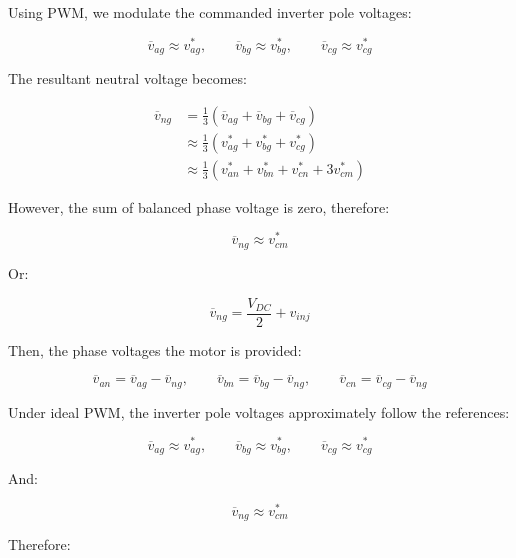 \documentclass{article}
\begin{document}
Using PWM, we modulate the commanded inverter pole voltages:

\begin{equation}
    \overline{v}_{ag} \approx v_{ag}^*, \qquad
    \overline{v}_{bg} \approx v_{bg}^*, \qquad
    \overline{v}_{cg} \approx v_{cg}^*
\end{equation}

The resultant neutral voltage becomes:

\begin{align}
    \overline{v}_{ng}
    &= \frac{1}{3}(\overline{v}_{ag} + \overline{v}_{bg} + \overline{v}_{cg}) \\
    &\approx \frac{1}{3}(v_{ag}^* + v_{bg}^* + v_{cg}^*) \\
    &\approx \frac{1}{3}(v_{an}^* + v_{bn}^* + v_{cn}^* + 3v_{cm}^*)
\end{align}

However, the sum of balanced phase voltage is zero, therefore:

\begin{equation}
    \overline{v}_{ng} \approx v_{cm}^*
\end{equation}

Or:

\begin{equation}
    \overline{v}_{ng} = \frac{V_{DC}}{2} + v_{inj}
\end{equation}

Then, the phase voltages the motor is provided:

\begin{equation}
    \overline{v}_{an} = \overline{v}_{ag} - \overline{v}_{ng}, \qquad
    \overline{v}_{bn} = \overline{v}_{bg} - \overline{v}_{ng}, \qquad
    \overline{v}_{cn} = \overline{v}_{cg} - \overline{v}_{ng}
\end{equation}

Under ideal PWM, the inverter pole voltages approximately follow the references:

\begin{equation}
    \overline{v}_{ag} \approx v_{ag}^*, \qquad
    \overline{v}_{bg} \approx v_{bg}^*, \qquad
    \overline{v}_{cg} \approx v_{cg}^*
\end{equation}

And:

\begin{equation}
    \overline{v}_{ng} \approx v_{cm}^*
\end{equation}

Therefore:
\end{document}
